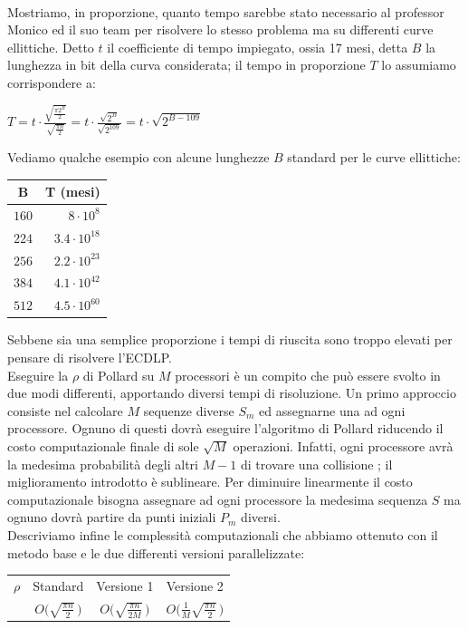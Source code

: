 \documentclass[a4paper,12pt]{tesiinfo}
\newcommand\ddfrac[2]{\frac{\displaystyle #1}{\displaystyle #2}}
\begin{document}
\\
Mostriamo, in proporzione, quanto tempo sarebbe stato necessario al professor Monico ed il suo team per risolvere lo stesso problema ma su differenti curve ellittiche. Detto $t$ il coefficiente di tempo impiegato, ossia 17 mesi, detta $B$ la lunghezza in bit della curva considerata; il tempo in proporzione $T$ lo assumiamo corrispondere a:
\begin{center}
 $T = t \cdot \ddfrac{\sqrt{\ddfrac{\pi 2^B}{2}}}{\sqrt{\ddfrac{\pi n}{2}}} = t \cdot \ddfrac{\sqrt{2^{B}}}{\sqrt{2^{109}}} = t \cdot \sqrt{2^{B-109}}$
\end{center}
Vediamo qualche esempio con alcune lunghezze $B$ standard per le curve ellittiche:
\begin{center}
\begin{tabular}{ c r }
 B & T (mesi)\\
 \hline
 $160$ &$8 \cdot 10^8$\\
 $224$ &$3.4 \cdot 10^{18}$\\
 $256$ &$2.2 \cdot 10^{23}$\\
 $384$ &$4.1 \cdot 10^{42}$\\
 $512$ &$4.5 \cdot 10^{60}$
\end{tabular}
\end{center}
Sebbene sia una semplice proporzione i tempi di riuscita sono troppo elevati per pensare di risolvere l'ECDLP.
\\
Eseguire la $\rho$ di Pollard su $M$ processori \`e un compito che pu\`o essere svolto in due modi differenti, apportando diversi tempi di risoluzione. Un primo approccio consiste nel calcolare $M$ sequenze diverse $S_m$ ed assegnarne una ad ogni processore. Ognuno di questi dovr\`a eseguire l'algoritmo di Pollard riducendo il costo computazionale finale di sole $\sqrt{M}$ operazioni. Infatti, ogni processore avr\`a la medesima probabilit\`a degli altri $M-1$ di trovare una collisione \cite{rho speed1, rho speed2}; il miglioramento introdotto \`e sublineare. Per diminuire linearmente il costo computazionale bisogna assegnare ad ogni processore la medesima sequenza $S$ ma ognuno dovr\`a partire da punti iniziali $P_m$ diversi. 
\\
Descriviamo infine le complessit\`a computazionali che abbiamo ottenuto con il metodo base e le due differenti versioni parallelizzate:
\begin{center}
\begin{tabular}{l c  c  c}
    $\rho$ & Standard & Versione 1 & Versione 2\\
    &  $O\Big (\sqrt{\ddfrac{\pi n}{2}}\, \Big )$ & $O \Big (\sqrt{\ddfrac{\pi n}{2M}}\, \Big )$ & $O\Big (\ddfrac{1}{M}\sqrt{\ddfrac{\pi n}{2}}\, \Big )$
\end{tabular}
\end{center}
%
%
%
%
%
%
%
%
%
\end{document}

